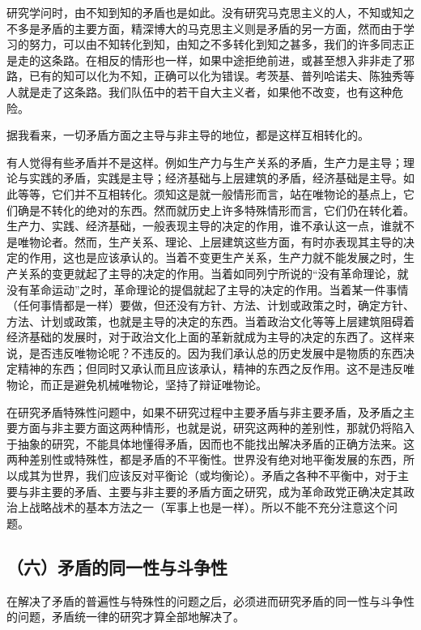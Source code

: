 研究学问时，由不知到知的矛盾也是如此。没有研究马克思主义的人，不知或知之不多是矛盾的主要方面，精深博大的马克思主义则是矛盾的另一方面，然而由于学习的努力，可以由不知转化到知，由知之不多转化到知之甚多，我们的许多同志正是走的这条路。在相反的情形也一样，如果中途拒绝前进，或甚至想入非非走了邪路，已有的知可以化为不知，正确可以化为错误。考茨基、普列哈诺夫、陈独秀等人就是走了这条路。我们队伍中的若干自大主义者，如果他不改变，也有这种危险。

据我看来，一切矛盾方面之主导与非主导的地位，都是这样互相转化的。

有人觉得有些矛盾并不是这样。例如生产力与生产关系的矛盾，生产力是主导；理论与实践的矛盾，实践是主导；经济基础与上层建筑的矛盾，经济基础是主导。如此等等，它们并不互相转化。须知这是就一般情形而言，站在唯物论的基点上，它们确是不转化的绝对的东西。然而就历史上许多特殊情形而言，它们仍在转化着。生产力、实践、经济基础，一般表现主导的决定的作用，谁不承认这一点，谁就不是唯物论者。然而，生产关系、理论、上层建筑这些方面，有时亦表现其主导的决定的作用，这也是应该承认的。当着不变更生产关系，生产力就不能发展之时，生产关系的变更就起了主导的决定的作用。当着如同列宁所说的“没有革命理论，就没有革命运动”之时，革命理论的提倡就起了主导的决定的作用。当着某一件事情（任何事情都是一样）要做，但还没有方针、方法、计划或政策之时，确定方针、方法、计划或政策，也就是主导的决定的东西。当着政治文化等等上层建筑阻碍着经济基础的发展时，对于政治文化上面的革新就成为主导的决定的东西了。这样来说，是否违反唯物论呢？不违反的。因为我们承认总的历史发展中是物质的东西决定精神的东西；但同时又承认而且应该承认，精神的东西之反作用。这不是违反唯物论，而正是避免机械唯物论，坚持了辩证唯物论。

在研究矛盾特殊性问题中，如果不研究过程中主要矛盾与非主要矛盾，及矛盾之主要方面与非主要方面这两种情形，也就是说，研究这两种的差别性，那就仍将陷入于抽象的研究，不能具体地懂得矛盾，因而也不能找出解决矛盾的正确方法来。这两种差别性或特殊性，都是矛盾的不平衡性。世界没有绝对地平衡发展的东西，所以成其为世界，我们应该反对平衡论（或均衡论）。矛盾之各种不平衡中，对于主要与非主要的矛盾、主要与非主要的矛盾方面之研究，成为革命政党正确决定其政治上战略战术的基本方法之一（军事上也是一样）。所以不能不充分注意这个问题。

\subsection{（六）矛盾的同一性与斗争性}

在解决了矛盾的普遍性与特殊性的问题之后，必须进而研究矛盾的同一性与斗争性的问题，矛盾统一律的研究才算全部地解决了。

